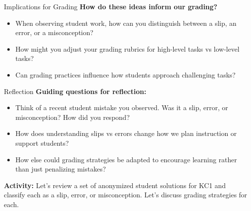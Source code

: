 \documentclass{beamer}
\begin{document}
\begin{frame}{Implications for Grading}
\textbf{How do these ideas inform our grading?}
\vspace{0.3cm}

\begin{itemize}
    \item When observing student work, how can you distinguish between a slip, an error, or a misconception?
    \item How might you adjust your grading rubrics for high-level tasks vs low-level tasks?  
    \item Can grading practices influence how students approach challenging tasks?
\end{itemize}
\end{frame}

\begin{frame}{Reflection}
\textbf{Guiding questions for reflection:}
\begin{itemize}
    \item Think of a recent student mistake you observed. Was it a slip, error, or misconception? How did you respond?  
    \item How does understanding slips vs errors change how we plan instruction or support students?  
    \item How else could grading strategies be adapted to encourage learning rather than just penalizing mistakes?
\end{itemize}

\vspace{0.2cm}
\textbf{Activity:}  
Let's review a set of anonymized student solutions for KC1 and classify each as a slip, error, or misconception. Let's discuss grading strategies for each.
\end{frame}
\end{document}
